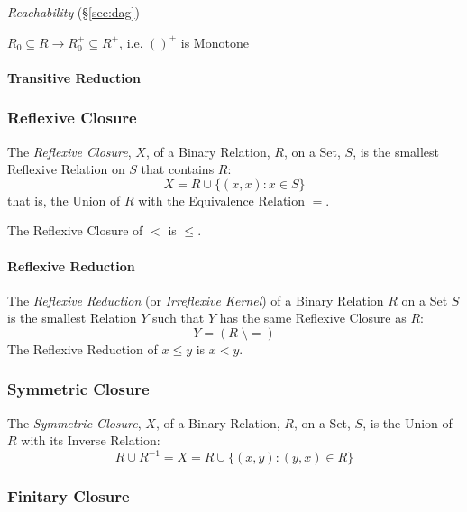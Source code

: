 \emph{Reachability} (\S\ref{sec:dag})

$R_0 \subseteq R \to R_0^+ \subseteq R^+$, i.e. $()^+$ is
Monotone \cite{aczel88}



\paragraph{Transitive Reduction}\label{sec:transitive_reduction}\hfill



\subsubsection{Reflexive Closure}\label{sec:reflexive_closure}

The \emph{Reflexive Closure}, $X$, of a Binary Relation, $R$, on a
Set, $S$, is the smallest Reflexive Relation on $S$ that contains $R$:
\[
  X = R \cup \{(x,x) : x \in S\}
\]
that is, the Union of $R$ with the Equivalence Relation $=$.

The Reflexive Closure of $<$ is $\leq$.



\paragraph{Reflexive Reduction}\label{sec:reflexive_reduction}\hfill

The \emph{Reflexive Reduction} (or \emph{Irreflexive Kernel}) of a
Binary Relation $R$ on a Set $S$ is the smallest Relation $Y$ such
that $Y$ has the same Reflexive Closure as $R$:
\[
  Y = (R\;\setminus=)
\]
The Reflexive Reduction of $x \leq y$ is $x < y$.



\subsubsection{Symmetric Closure}\label{sec:symmetric_closure}

The \emph{Symmetric Closure}, $X$, of a Binary Relation, $R$, on a
Set, $S$, is the Union of $R$ with its Inverse Relation:
\[
  R \cup R^{-1} = X = R \cup \{(x,y) : (y,x) \in R\}
\]



\subsubsection{Finitary Closure}\label{sec:finitary_closure}

